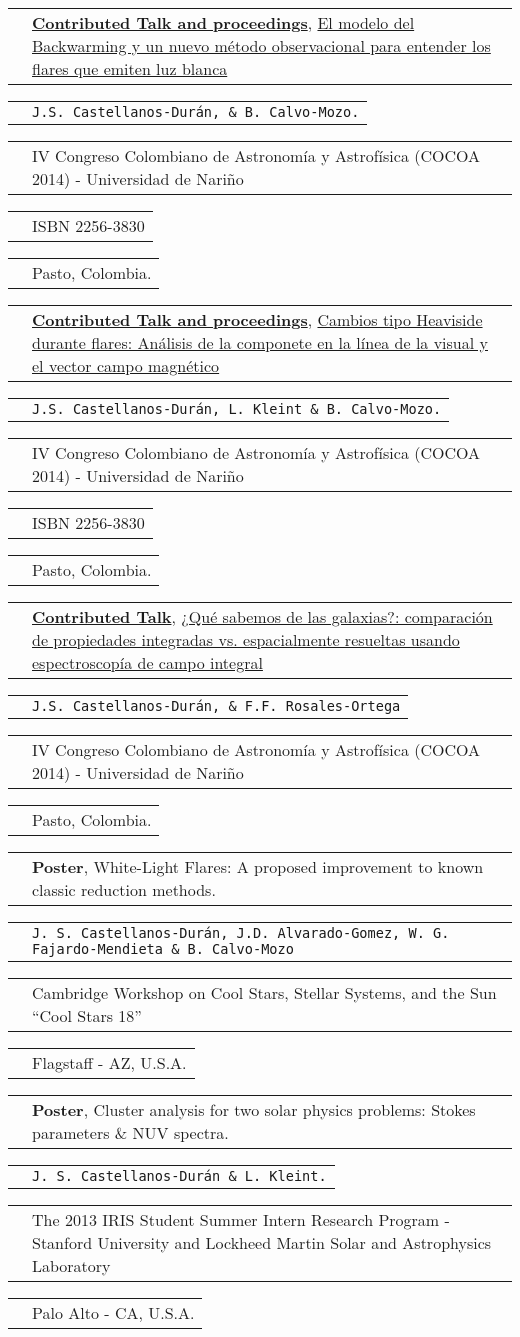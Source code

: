 \documentclass[11pt,letterpaper,sans]{moderncv}        %
\makeatletter
\renewcommand*{\cvitem}[3][.25em]{%
  \begin{tabular}{@{}p{\hintscolumnwidth}@{\hspace{\separatorcolumnwidth}}p{\maincolumnwidth}@{}}%
      \raggedleft\hintstyle{#2} &{#3}%
  \end{tabular}%
  \par\addvspace{#1}}
\makeatother
\begin{document}
\cvitem{Dec 1 - 5 2014}{\href{http://aulavirtual.udenar.edu.co/cocoa/}{\textbf{Contributed Talk and proceedings}}, \href{http://aulavirtual.udenar.edu.co/cocoa/wp-content/uploads/2014/12/Resumenes-IV-COCOA-2014.pdf}{El modelo del Backwarming y un nuevo método observacional para entender los flares que emiten luz blanca} }
\cvitem{}{\texttt{J.S. Castellanos-Dur\'an,  \& B. Calvo-Mozo.}}
\cvitem{}{IV Congreso Colombiano de Astronom\'{i}a y Astrof\'{i}sica (COCOA 2014) - Universidad de Nariño}
\cvitem{}{ISBN 2256-3830}
\cvitem{}{Pasto, Colombia.}
\cvitem{Dec 1 - 5 2014}{\href{http://aulavirtual.udenar.edu.co/cocoa/}{\textbf{Contributed Talk and proceedings}}, \href{http://aulavirtual.udenar.edu.co/cocoa/wp-content/uploads/2014/12/Resumenes-IV-COCOA-2014.pdf}{Cambios tipo Heaviside durante flares: Análisis de la componete en la línea de la visual y el vector
campo magnético} }
\cvitem{}{\texttt{J.S. Castellanos-Dur\'an, L. Kleint \& B. Calvo-Mozo.}}
\cvitem{}{IV Congreso Colombiano de Astronom\'{i}a y Astrof\'{i}sica (COCOA 2014) - Universidad de Nariño}
\cvitem{}{ISBN 2256-3830}
\cvitem{}{Pasto, Colombia.}
\cvitem{Dec 1 - 5 2014}{\href{http://aulavirtual.udenar.edu.co/cocoa/}{\textbf{Contributed Talk}}, \href{http://aulavirtual.udenar.edu.co/cocoa/wp-content/uploads/2014/12/Resumenes-IV-COCOA-2014.pdf}{¿Qu\'e sabemos de las galaxias?: comparaci\'on de propiedades integradas vs. espacialmente
resueltas usando espectroscop\'{i}a de campo integral} }
\cvitem{}{\texttt{J.S. Castellanos-Dur\'an,  \& F.F. Rosales-Ortega}}
\cvitem{}{IV Congreso Colombiano de Astronom\'{i}a y Astrof\'{i}sica (COCOA 2014) - Universidad de Nariño}
\cvitem{}{Pasto, Colombia.}
\cvitem{Jun 9 - 13}{\textbf{Poster}, White-Light Flares: A proposed improvement to known classic reduction methods.}
\cvitem{2014}{\texttt{J. S. Castellanos-Dur\'an, J.D. Alvarado-Gomez, W. G. Fajardo-Mendieta \& B. Calvo-Mozo}}
\cvitem{}{Cambridge Workshop on Cool Stars, Stellar Systems, and the Sun ``Cool Stars 18''}
\cvitem{}{Flagstaff - AZ, U.S.A.}
\cvitem{Aug 30}{\textbf{Poster}, Cluster analysis for two solar physics problems: Stokes parameters \& NUV spectra.}
\cvitem{2013}{\texttt{J. S. Castellanos-Dur\'an \& L. Kleint.}}
\cvitem{}{The 2013 IRIS Student Summer Intern Research Program - Stanford University and Lockheed Martin Solar and Astrophysics Laboratory}
\cvitem{}{Palo Alto - CA, U.S.A.}
\end{document}
